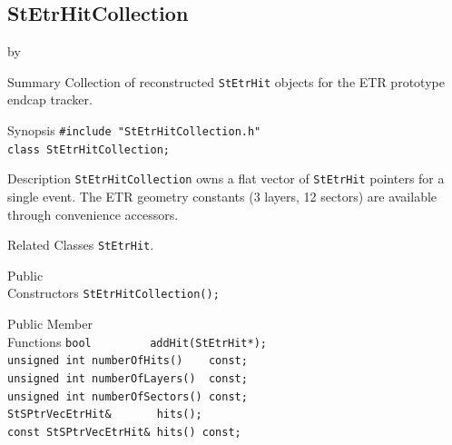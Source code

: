 \documentclass[twoside]{article}
\newcommand{\entrylabel}[1]{\mbox{\textbf{{#1}}}\hfil}%
\newenvironment{entry}
{\begin{list}{}%
    {\renewcommand{\makelabel}{\entrylabel}%
     \setlength{\labelwidth}{90pt}%
     \setlength{\leftmargin}{\labelwidth}
     \advance\leftmargin by \labelsep%
      }%
    }%
  {\end{list}}
\newcommand{\Entrylabel}[1]%
{\raisebox{0pt}[1ex][0pt]{\makebox[\labelwidth][l]%
    {\parbox[t]{\labelwidth}{\hspace{0pt}\textbf{{#1}}}}}}
\newenvironment{Entry}%
{\renewcommand{\entrylabel}{\Entrylabel}\begin{entry}}%
  {\end{entry}}
\begin{document}
\subsection{StEtrHitCollection}
\label{sec:StEtrHitCollection}
\begin{Entry}
\item[Summary]
    Collection of reconstructed \texttt{StEtrHit} objects for the ETR
    prototype endcap tracker.

\item[Synopsis]
    \verb+#include "StEtrHitCollection.h"+\\
    \verb+class StEtrHitCollection;+\\

\item[Description]
    \texttt{StEtrHitCollection} owns a flat vector of \texttt{StEtrHit}
    pointers for a single event.  The ETR geometry constants (3 layers,
    12 sectors) are available through convenience accessors.

\item[Related Classes]
    \texttt{StEtrHit}.

\item[Public\\ Constructors]
    \verb+StEtrHitCollection();+\\

\item[Public Member\\ Functions]
    \verb+bool         addHit(StEtrHit*);+\\
    \verb+unsigned int numberOfHits()    const;+\\
    \verb+unsigned int numberOfLayers()  const;+\\
    \verb+unsigned int numberOfSectors() const;+\\
    \verb+StSPtrVecEtrHit&       hits();+\\
    \verb+const StSPtrVecEtrHit& hits() const;+\\
\end{Entry}
\clearpage

\end{document}
